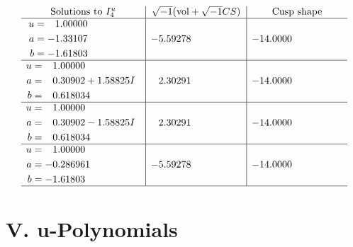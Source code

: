 \documentclass[1p]{elsarticle_modified}
\theoremstyle{definition}
\newcommand{\I}{\sqrt{-1}}
\begin{document}
$$\begin{array}{c|c|c}  
\text{Solutions to }I^u_{4}& \I (\text{vol} + \sqrt{-1}CS) & \text{Cusp shape}\\
 \hline 
\begin{aligned}
u &= \phantom{-}1.00000\phantom{ +0.000000I} \\
a &= -1.33107\phantom{ +0.000000I} \\
b &= -1.61803\phantom{ +0.000000I}\end{aligned}
 & -5.59278\phantom{ +0.000000I} & -14.0000\phantom{ +0.000000I} \\ \hline\begin{aligned}
u &= \phantom{-}1.00000\phantom{ +0.000000I} \\
a &= \phantom{-}0.30902 + 1.58825 I \\
b &= \phantom{-}0.618034\phantom{ +0.000000I}\end{aligned}
 & \phantom{-}2.30291\phantom{ +0.000000I} & -14.0000\phantom{ +0.000000I} \\ \hline\begin{aligned}
u &= \phantom{-}1.00000\phantom{ +0.000000I} \\
a &= \phantom{-}0.30902 - 1.58825 I \\
b &= \phantom{-}0.618034\phantom{ +0.000000I}\end{aligned}
 & \phantom{-}2.30291\phantom{ +0.000000I} & -14.0000\phantom{ +0.000000I} \\ \hline\begin{aligned}
u &= \phantom{-}1.00000\phantom{ +0.000000I} \\
a &= -0.286961\phantom{ +0.000000I} \\
b &= -1.61803\phantom{ +0.000000I}\end{aligned}
 & -5.59278\phantom{ +0.000000I} & -14.0000\phantom{ +0.000000I}\\
 \hline 
 \end{array}$$\newpage
\newpage\renewcommand{\arraystretch}{1}
\centering \section*{ V. u-Polynomials}
\end{document}
